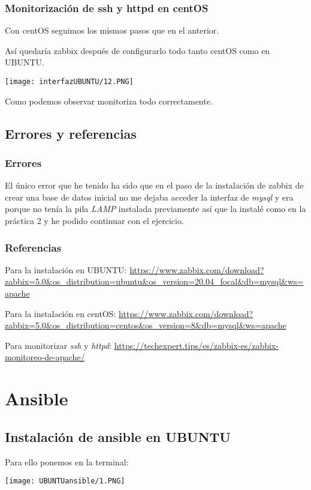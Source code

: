 \documentclass[a4paper, 12pt]{article}
\begin{document}
\subsubsection{Monitorización de ssh y httpd en centOS}
{Con centOS seguimos los mismos pasos que en el anterior. \par}
{Así quedaría zabbix después de  configurarlo todo tanto centOS como en UBUNTU. \par}
\texttt{[image: interfazUBUNTU/12.PNG]}
{ \par Como podemos observar monitoriza todo correctamente.}
\newpage
\subsection{Errores y referencias}
\subsubsection{Errores}
\begin{justify}
{\par El único error que he tenido ha sido que en el paso de la instalación de zabbix de crear una base de datos inicial no me dejaba acceder la interfaz de \textit{mysql} y era porque no tenía la pila \textit{LAMP} instalada previamente así que la instalé como en la práctica 2 y he podido continuar con el ejercicio.}
\end{justify}
\subsubsection{Referencias}
{Para la instalación en UBUNTU: \url{https://www.zabbix.com/download?zabbix=5.0&os_distribution=ubuntu&os_version=20.04_focal&db=mysql&ws=apache} \par} 
{Para la instalación en centOS: \url{https://www.zabbix.com/download?zabbix=5.0&os_distribution=centos&os_version=8&db=mysql&ws=apache} \par}
{Para monitorizar \textit{ssh} y \textit{httpd}:
\url{https://techexpert.tips/es/zabbix-es/zabbix-monitoreo-de-apache/}}

\newpage

\section{\Large Ansible}
\subsection{Instalación de ansible en UBUNTU}
{Para ello ponemos en la terminal: \par}
\texttt{[image: UBUNTUansible/1.PNG]}
\end{document}
